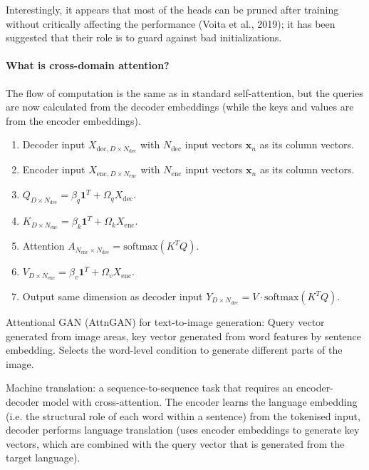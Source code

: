 Interestingly, it appears that most
of the heads can be pruned after training without critically affecting the performance (Voita
et al., 2019); it has been suggested that their role is to guard against bad initializations.

\paragraph{What is cross-domain attention?}

The flow of computation is the same as in standard self-attention,
but the queries are now calculated from the decoder embeddings
(while the keys and values are from the encoder embeddings).

\begin{enumerate}
    \item Decoder input $X_{\text{dec}, D \times N_\text{dec}}$ with $N_\text{dec}$ input vectors $\bm{x}_n$ as its column vectors.
    \item Encoder input $X_{\text{enc}, D \times N_\text{enc}}$ with $N_\text{enc}$ input vectors $\bm{x}_n$ as its column vectors.
    \item $Q_{D \times N_\text{dec}} = \beta_q \bm{1}^T + \Omega_q X_\text{dec}$.
    \item $K_{D \times N_\text{enc}} = \beta_k \bm{1}^T + \Omega_k X_\text{enc}$.
    \item Attention $A_{N_\text{enc} \times N_\text{dec}} = \text{softmax}(K^T Q)$.
    \item $V_{D \times N_\text{enc}} = \beta_v \bm{1}^T + \Omega_v X_\text{enc}$.
    \item Output same dimension as decoder input $Y_{D \times N_\text{dec}} = V \cdot \text{softmax}(K^T Q)$.
\end{enumerate}

Attentional GAN (AttnGAN) for text-to-image generation:
Query vector generated from image areas,
key vector generated from word features by sentence embedding.
Selects the word-level condition to generate different parts of the image.

Machine translation: a sequence-to-sequence task that requires an encoder-decoder model with cross-attention.
The encoder learns the language embedding (i.e. the structural role of each word within a sentence) from the tokenised input,
decoder performs language translation (uses encoder embeddings to generate key vectors, which are combined with the query vector that is generated from the target language).

